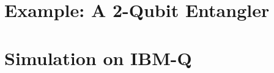 \documentclass{beamer}
\theoremstyle{definition}
\begin{document}
\section{Example: A 2-Qubit Entangler}














\section{Simulation on IBM-Q}
\end{document}
